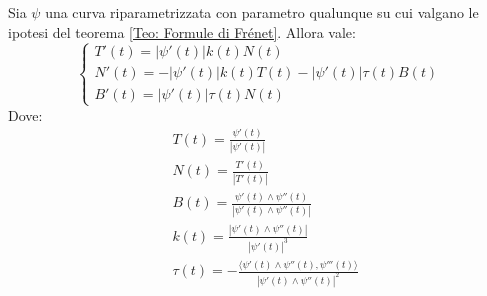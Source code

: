 \begin{theorem}
    Sia $\psi$ una curva riparametrizzata con parametro qualunque su cui valgano le ipotesi del teorema \ref{Teo: Formule di Frénet}. Allora vale:
    \begin{equation*}
        \begin{cases}
            T'(t)=|\psi'(t)| k(t) N(t)\\
            N'(t)=-|\psi'(t)| k(t) T(t) - |\psi'(t)| \tau(t)B(t)\\
            B'(t)=|\psi'(t)|\tau(t)N(t)
        \end{cases}
    \end{equation*}
    Dove:
    \begin{align}
        &T(t)=\frac{\psi'(t)}{|\psi'(t)|} \label{Eq: Frenet Tangente}\\
        &N(t)=\frac{T'(t)}{|T'(t)|} \label{Eq: Frenet Normale}\\
        &B(t)=\frac{\psi'(t)\wedge \psi''(t)} {|\psi'(t)\wedge \psi''(t)|} \label{Eq: Frenet Binormale}\\
        &k(t)=\frac{|\psi'(t)\wedge\psi''(t)|}{|\psi'(t)|^3} \label{Eq: Frenet Curvatura}\\
        &\tau(t)=-\frac{\langle\psi'(t)\wedge \psi''(t), \psi'''(t)\rangle}{|\psi'(t)\wedge \psi''(t)|^2} \label{Eq: Frenet Torsione}
    \end{align}    
\end{theorem}
